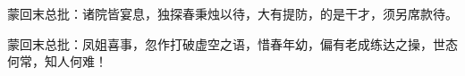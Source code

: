 \begin{parag}

    \begin{note}蒙回末总批：诸院皆宴息，独探春秉烛以待，大有提防，的是干才，须另席款待。\end{note}
\end{parag}


\begin{parag}


    \begin{note}蒙回末总批：凤姐喜事，忽作打破虚空之语，惜春年幼，偏有老成练达之操，世态何常，知人何难！\end{note}
\end{parag}
